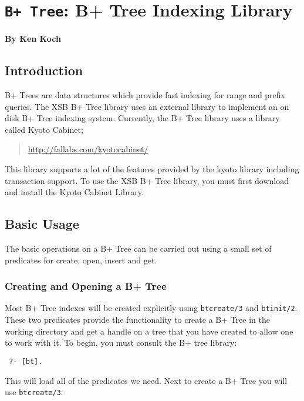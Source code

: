 
\chapter{{\tt B+ Tree}: B+ Tree Indexing Library}

\begin{center}
  {\Large {\bf By Ken Koch}}
\end{center}

\section{Introduction}

B+ Trees are data structures which provide fast indexing for range and prefix queries. 
The XSB B+ Tree library uses an external library to implement an on disk B+ Tree indexing system.
Currently, the B+ Tree library uses a library called Kyoto Cabinet;
\begin{quote}
  \url{http://fallabs.com/kyotocabinet/} 
\end{quote}
This library supports a lot of the features provided by the kyoto library including transaction support.
To use the XSB B+ Tree library, you must first download and install the Kyoto Cabinet Library.

\section{Basic Usage}

The basic operations on a B+ Tree can be carried out using a small set of predicates for create, open, insert and get.

\subsection{Creating and Opening a B+ Tree}

Most B+ Tree indexes will be created explicitly using {\tt btcreate/3} and {\tt btinit/2}. 
These two predicates provide the functionality to create a B+ Tree in the working directory and 
get a handle on a tree that you have created to allow one to work with it. To begin, you must consult the B+ 
tree library:
\begin{verbatim}
 ?- [bt].  
\end{verbatim}
This will load all of the predicates we need. Next to create a B+ Tree you will use {\tt btcreate/3}:

